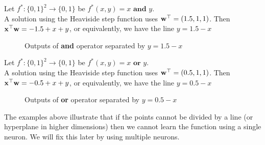 \begin{example}
    Let $f^*:\{0,1\}^2\to\{0,1\}$ be $f^*(x,y)=x\textbf{ and }y$. \\
    A solution using the Heaviside step function uses $\vw^\top = (1.5,1,1)$. Then $\vx^\top\vw = -1.5+x+y$, or equivalently, we have the line $y=1.5-x$
    \begin{figure}
    \centering
    \caption{Outputs of \textbf{and} operator separated by $y=1.5-x$}
    \label{fig:9.1Ex2}
\end{figure}
\end{example}

\begin{example}
    Let $f^*:\{0,1\}^2\to\{0,1\}$ be $f^*(x,y)=x\textbf{ or }y$. \\
    A solution using the Heaviside step function uses $\vw^\top = (0.5,1,1)$. Then $\vx^\top\vw = -0.5+x+y$, or equivalently, we have the line $y=0.5-x$
    \begin{figure}
    \centering
    \caption{Outputs of \textbf{or} operator separated by $y=0.5-x$}
    \label{fig:9.1Ex2}
\end{figure}
\end{example}

The examples above illustrate that if the points cannot be divided by a line (or hyperplane in higher dimensions) then we cannot learn the function using a single neuron. We will fix this later by using multiple neurons.

